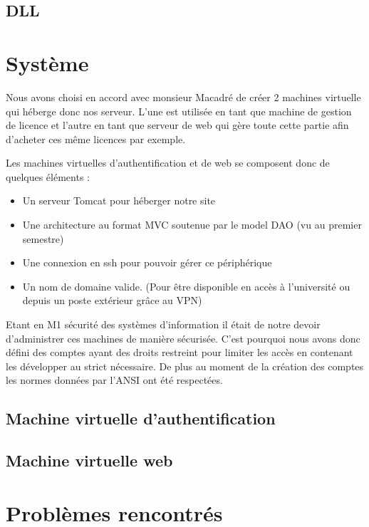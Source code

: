 \section{DLL}

\chapter{Système}

Nous avons choisi en accord avec monsieur Macadré de créer 2 machines virtuelle qui héberge donc nos serveur. L'une est utilisée en tant que machine de gestion de licence 
et l'autre en tant que serveur de web qui gère toute cette partie afin d'acheter ces même licences par exemple.\newline

Les machines virtuelles d'authentification et de web se composent donc de quelques éléments :\newline

\begin{itemize}
	\item Un serveur Tomcat pour héberger notre site
	\item Une architecture au format MVC soutenue par le model DAO (vu au premier semestre)
	\item Une connexion en ssh pour pouvoir gérer ce périphérique
	\item Un nom de domaine valide. (Pour être disponible en accès à l'université ou depuis un poste extérieur grâce au VPN)\newline
\end{itemize}

Etant en M1 sécurité des systèmes d'information il était de notre devoir d'administrer ces machines de manière sécurisée.
C'est pourquoi nous avons donc défini des comptes ayant des droits restreint pour limiter les accès en contenant les développer au strict nécessaire.
De plus au moment de la création des comptes les normes données par l'ANSI ont été respectées.

\section{Machine virtuelle d'authentification}

\section{Machine virtuelle web}

\chapter{Problèmes rencontrés}

